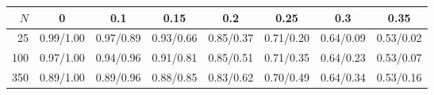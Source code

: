 \begin{tabular}{rccccccc}
\toprule
$N$ & 0 & 0.1 & 0.15 & 0.2 & 0.25 & 0.3 & 0.35 \\
\midrule
25 & 0.99/1.00 & 0.97/0.89 & 0.93/0.66 & 0.85/0.37 & 0.71/0.20 & 0.64/0.09 & 0.53/0.02 \\
100 & 0.97/1.00 & 0.94/0.96 & 0.91/0.81 & 0.85/0.51 & 0.71/0.35 & 0.64/0.23 & 0.53/0.07 \\
350 & 0.89/1.00 & 0.89/0.96 & 0.88/0.85 & 0.83/0.62 & 0.70/0.49 & 0.64/0.34 & 0.53/0.16 \\
\bottomrule
\end{tabular}
